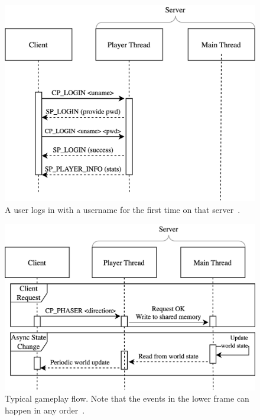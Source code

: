 \begin{figure}[h]
  \includegraphics[width=\columnwidth]{figures/nt-login}
  \caption{A user logs in with a username for the first time on that server~\cite{netreksrc}.}
  \Description[]{}
\end{figure}
\begin{figure}[h]
  \includegraphics[width=\columnwidth]{figures/nt-typical}
  \caption{Typical gameplay flow. Note that the events in the lower frame can happen in any order~\cite{netreksrc}.}
  \Description[]{}
\end{figure}
